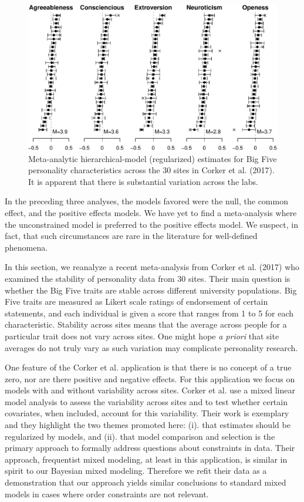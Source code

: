 \documentclass[english,man]{apa6}
\theoremstyle{definition}
\theoremstyle{definition}
\theoremstyle{definition}
\theoremstyle{remark}
\begin{document}
\begin{figure}[htbp]
\centering
\includegraphics{p_files/figure-latex/corkerEst-1.pdf}
\caption{\label{fig:corkerEst}Meta-analytic hierarchical-model (regularized)
estimates for Big Five personality characteristics across the 30 sites
in Corker et al. (2017). It is apparent that there is substantial
variation across the labs.}
\end{figure}

In the preceding three analyses, the models favored were the null, the
common effect, and the positive effects models. We have yet to find a
meta-analysis where the unconstrained model is preferred to the positive
effects model. We suspect, in fact, that such circumstances are rare in
the literature for well-defined phenomena.

In this section, we reanalyze a recent meta-analysis from Corker et al.
(2017) who examined the stability of personality data from 30 sites.
Their main question is whether the Big Five traits are stable across
different university populations. Big Five traits are measured as Likert
scale ratings of endorsement of certain statements, and each individual
is given a score that ranges from 1 to 5 for each characteristic.
Stability across sites means that the average across people for a
particular trait does not vary across sites. One might hope \emph{a
priori} that site averages do not truly vary as such variation may
complicate personality research.

One feature of the Corker et al. application is that there is no concept
of a true zero, nor are there positive and negative effects. For this
application we focus on models with and without variability across
sites. Corker et al. use a mixed linear model analysis to assess the
variability across sites and to test whether certain covariates, when
included, account for this variability. Their work is exemplary and they
highlight the two themes promoted here: (i). that estimates should be
regularized by models, and (ii). that model comparison and selection is
the primary approach to formally address questions about constraints in
data. Their approach, frequentist mixed modeling, at least in this
application, is similar in spirit to our Bayesian mixed modeling.
Therefore we refit their data as a demonstration that our approach
yields similar conclusions to standard mixed models in cases where order
constraints are not relevant.
\end{document}
